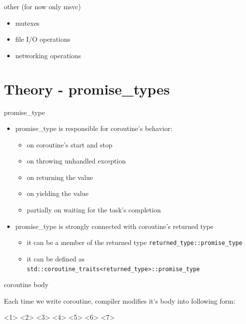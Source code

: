 \documentclass[10pt]{beamer}
\newcommand{\code}[1]{\texttt{#1}}
\begin{document}
\begin{frame}{other (for now only msvc)}
  \begin{itemize}
    \item mutexes
    \item file I/O operations
    \item networking operations
  \end{itemize}
\end{frame}

\section{Theory - promise\_types}

\begin{frame}{promise\_type}
  \begin{itemize}[<+- |alert@+>]
    \item promise\_type is responsible for coroutine's behavior:
    \begin{itemize}
      \item on coroutine's start and stop
      \item on throwing unhandled exception
      \item on returning the value
      \item on yielding the value
      \item partially on waiting for the task's completion
    \end{itemize}
    \item promise\_type is strongly connected with coroutine's returned type
    \begin{itemize}[<+- |alert@+>]
      \item it can be a member of the returned type \code{returned\_type::promise\_type}
      \item it can be defined as \code{std::coroutine\_traits<returned\_type>::promise\_type}
    \end{itemize}
  
  \end{itemize}
\end{frame}

\begin{frame}{coroutine body}
\centerline{Each time we write coroutine, compiler modifies it's body into following form:}
<1>
<2>
<3>
<4>
<5>
<6>
<7>
\end{frame}
\end{document}
